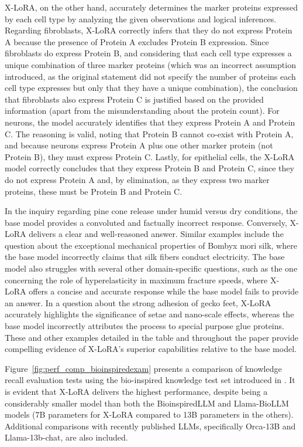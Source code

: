 X-LoRA, on the other hand, accurately determines the marker proteins expressed by each cell type by analyzing the given observations and logical inferences. Regarding fibroblasts, X-LoRA correctly infers that they do not express Protein A because the presence of Protein A excludes Protein B expression. Since fibroblasts do express Protein B, and considering that each cell type expresses a unique combination of three marker proteins (which was an incorrect assumption introduced, as the original statement did not specify the number of proteins each cell type expresses but only that they have a unique combination), the conclusion that fibroblasts also express Protein C is justified based on the provided information (apart from the misunderstanding about the protein count). For neurons, the model accurately identifies that they express Protein A and Protein C. The reasoning is valid, noting that Protein B cannot co-exist with Protein A, and because neurons express Protein A plus one other marker protein (not Protein B), they must express Protein C. Lastly, for epithelial cells, the X-LoRA model correctly concludes that they express Protein B and Protein C, since they do not express Protein A and, by elimination, as they express two marker proteins, these must be Protein B and Protein C.

In the inquiry regarding pine cone release under humid versus dry conditions, the base model provides a convoluted and factually incorrect response. Conversely, X-LoRA delivers a clear and well-reasoned answer. Similar examples include the question about the exceptional mechanical properties of Bombyx mori silk, where the base model incorrectly claims that silk fibers conduct electricity. The base model also struggles with several other domain-specific questions, such as the one concerning the role of hyperelasticity in maximum fracture speeds, where X-LoRA offers a concise and accurate response while the base model fails to provide an answer. In a question about the strong adhesion of gecko feet, X-LoRA accurately highlights the significance of setae and nano-scale effects, whereas the base model incorrectly attributes the process to special purpose glue proteins. These and other examples detailed in the table and throughout the paper provide compelling evidence of X-LoRA’s superior capabilities relative to the base model.

Figure~\ref{fig:perf_comp_bioinspiredexam} presents a comparison of knowledge recall evaluation tests using the bio-inspired knowledge test set introduced in \cite{Luu2023BioinspiredLLM:Materials}. It is evident that X-LoRA delivers the highest performance, despite being a considerably smaller model than both the BioinspiredLLM and Llama-BioLLM models (7B parameters for X-LoRA compared to 13B parameters in the others). Additional comparisons with recently published LLMs, specifically Orca-13B and Llama-13b-chat, are also included.

